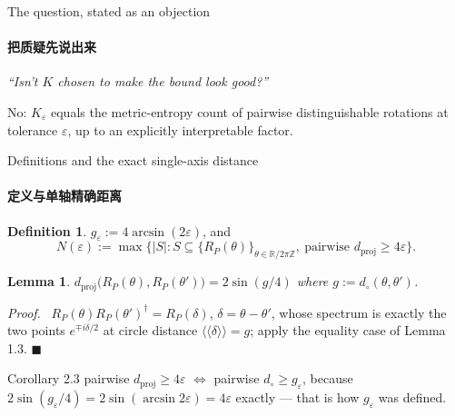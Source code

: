 \documentclass[aspectratio=169,10pt]{beamer}
\newif\ifzh \zhfalse
\newcommand{\bl}[2]{\ifzh #2\else #1\fi}
\newtheorem{lemma2}{Lemma}
\theoremstyle{definition}
\newtheorem{defn}{Definition}
\newenvironment{prf}[1][Proof]%
  {\par\smallskip\noindent\textit{#1.}\ \ignorespaces}%
  {\hfill$\blacksquare$\par\smallskip}
\newcommand{\dproj}{d_{\mathrm{proj}}}
\newcommand{\cd}[1]{\langle\!\langle #1 \rangle\!\rangle}
\newcommand{\zhsub}[1]{\ifzh\else\framesubtitle{#1}\fi}
\begin{document}
\begin{frame}{\bl{The question, stated as an objection}{把质疑先说出来}}
  \zhsub{把质疑先说出来}
  \vfill
  \begin{center}
  \begin{minipage}{0.84\textwidth}
    \begin{block}{}
      \large
      \emph{``Isn't $K$ chosen to make the bound look good?''}
      \bigskip

      \alert{No:} $K_\varepsilon$ equals the metric-entropy count of pairwise
      distinguishable rotations at tolerance $\varepsilon$, up to an
      explicitly interpretable factor.
    \end{block}
  \end{minipage}
  \end{center}
  \vfill
\end{frame}

\begin{frame}{\bl{Definitions and the exact single-axis distance}%
                {定义与单轴精确距离}}
  \zhsub{定义与单轴精确距离}
  \small
  \begin{defn}
    $g_\varepsilon:=4\arcsin(2\varepsilon)$, and
    \[ N(\varepsilon):=\max\big\{|S|:S\subseteq
       \{R_P(\theta)\}_{\theta\in\mathbb{R}/2\pi\mathbb{Z}},\
       \text{pairwise }\dproj\ge4\varepsilon\big\}. \]
  \end{defn}
  \pause
  \begin{lemma2}
    $\dproj\big(R_P(\theta),R_P(\theta')\big)=2\sin(g/4)$ where
    $g:=d_\circ(\theta,\theta')$.
  \end{lemma2}
  \begin{prf}\footnotesize
    $R_P(\theta)R_P(\theta')^\dagger=R_P(\delta)$, $\delta=\theta-\theta'$,
    whose spectrum is exactly the two points $e^{\mp i\delta/2}$ at circle
    distance $\cd\delta=g$; apply the equality case of Lemma 1.3.
  \end{prf}
  \pause
  \begin{block}{Corollary 2.3}\footnotesize
    pairwise $\dproj\ge4\varepsilon$ $\iff$ pairwise
    $d_\circ\ge g_\varepsilon$, because
    $2\sin(g_\varepsilon/4)=2\sin(\arcsin2\varepsilon)=4\varepsilon$
    \alert{exactly} --- that is how $g_\varepsilon$ was defined.
  \end{block}
\end{frame}
\end{document}
